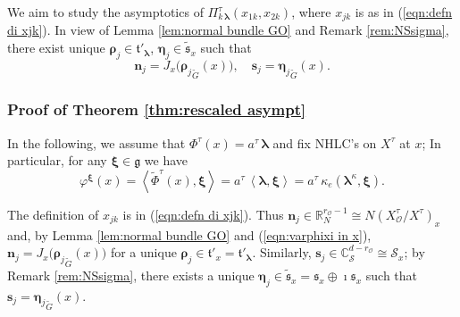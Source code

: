 \documentclass[12pt,a4paper]{article}
\theoremstyle{plain}
\theoremstyle{definition}
\begin{document}
We aim to study the asymptotics of $\Pi^\tau_{k\,\boldsymbol{\lambda}}(x_{1k},x_{2k})$, where $x_{jk}$ is as in (\ref{eqn:defn di xjk}).
In view of Lemma \ref{lem:normal bundle GO} and Remark
\ref{rem:NSsigma}, there exist unique 
$\boldsymbol{\rho}_j\in \mathfrak{t}'_{\boldsymbol{\lambda}}$,
$\boldsymbol{\eta}_j\in \tilde{\mathfrak{s}}_x$ 
such that 
\begin{equation}
\label{eqn:njsj}
\mathbf{n}_j=J_x\big({\boldsymbol{\rho}_j}_{\tilde{G}}(x)\big),\quad 
\mathbf{s}_j={\boldsymbol{\eta}_j}_{\tilde{G}}(x).
\end{equation}
%




\subsubsection{Proof of Theorem \ref{thm:rescaled asympt}}

In the following, we assume that $\Phi^\tau(x)=a^\tau\,\boldsymbol{\lambda}$ and fix NHLC's on
$X^\tau$ at $x$; 
In particular, for any $\boldsymbol{\xi}\in \mathfrak{g}$ we have
\begin{equation}
\label{eqn:varphixi in x}
\varphi^{\boldsymbol{\xi}}(x)=
\left\langle\tilde{\Phi}^\tau(x),\boldsymbol{\xi}\right\rangle
=a^\tau\,\left\langle\boldsymbol{\lambda},\boldsymbol{\xi}\right\rangle
=a^\tau\,\kappa_e\left(\boldsymbol{\lambda}^\kappa,\boldsymbol{\xi}\right).
\end{equation}
%

The definition of $x_{jk}$ is in (\ref{eqn:defn di xjk}).
Thus
$\mathbf{n}_j\in \mathbb{R}^{r_{\mathcal{O}}-1}_{N}\cong N(X^\tau_{\mathcal{O}}/X^\tau)_x$ and, by Lemma 
\ref{lem:normal bundle GO} and (\ref{eqn:varphixi in x}),
$\mathbf{n}_j=J_x\big({\boldsymbol{\rho}_j}_{\tilde{G}}(x)\big)$
for a unique $\boldsymbol{\rho}_j\in \mathfrak{t}'_x=\mathfrak{t}'_{\boldsymbol{\lambda}}$.
Similarly,
$\mathbf{s}_j\in \mathbb{C}^{d-r_{\mathcal{O}}}_{\mathcal{S}}
\cong 
\mathcal{S}_x
$; by Remark \ref{rem:NSsigma}, there exists a unique 
$\boldsymbol{\eta}_j\in \widetilde{\mathfrak{s}}_x=\mathfrak{s}_x\oplus \imath\mathfrak{s}_x$ such that 
$\mathbf{s}_j={\boldsymbol{\eta}_j}_{\tilde{G}}(x)$.
%
\end{document}
